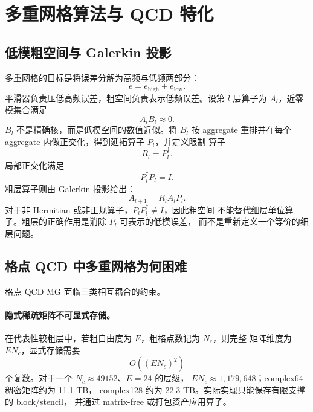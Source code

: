 \documentclass[UTF8,a4paper,11pt,fontset=none]{ctexart}
\numberwithin{equation}{section}
\numberwithin{figure}{section}
\numberwithin{table}{section}
\begin{document}
\section{多重网格算法与 QCD 特化}

\subsection{低模粗空间与 Galerkin 投影}

多重网格的目标是将误差分解为高频与低频两部分：
\begin{equation}
 e=e_{\mathrm{high}}+e_{\mathrm{low}}.
\label{eq:error-split}
\end{equation}
平滑器负责压低高频误差，粗空间负责表示低频误差。设第 \(l\) 层算子为
\(A_l\)，近零模集合满足
\begin{equation}
 A_lB_l\approx 0.
\label{eq:near-null}
\end{equation}
\(B_l\) 不是精确核，而是低模空间的数值近似。将 \(B_l\) 按 aggregate
重排并在每个 aggregate 内做正交化，得到延拓算子 \(P_l\)，并定义限制
算子
\begin{equation}
 R_l=P_l^\dagger.
\label{eq:restriction}
\end{equation}
局部正交化满足
\begin{equation}
 P_l^\dagger P_l=I.
\label{eq:local-orthogonality}
\end{equation}
粗层算子则由 Galerkin 投影给出：
\begin{equation}
 A_{l+1}=R_lA_lP_l.
\label{eq:galerkin}
\end{equation}
对于非 Hermitian 或非正规算子，\(P_lP_l^\dagger\neq I\)，因此粗空间
不能替代细层单位算子。粗层的正确作用是消除 \(P_l\) 可表示的低模误差，
而不是重新定义一个等价的细层问题。

\subsection{格点 QCD 中多重网格为何困难}

格点 QCD MG 面临三类相互耦合的约束。

\paragraph{隐式稀疏矩阵不可显式存储。}
在代表性较粗层中，若粗自由度为 \(E\)，粗格点数记为 \(N_c\)，则完整
矩阵维度为 \(EN_c\)，显式存储需要
\begin{equation}
 O\left((EN_c)^2\right)
\label{eq:dense-scaling}
\end{equation}
个复数。对于一个 \(N_c\approx49152\)、\(E=24\) 的层级，
\(EN_c\approx1{,}179{,}648\)；complex64 稠密矩阵约为 11.1 TB，
complex128 约为 22.3 TB。实际实现只能保存有限支撑的 block/stencil，
并通过 matrix-free 或打包资产应用算子。
\end{document}
